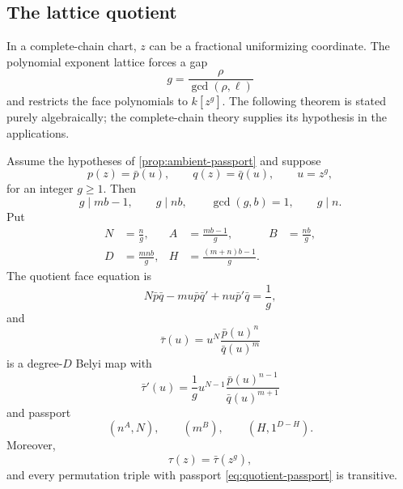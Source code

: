 \documentclass[11pt,reqno]{amsart}
\begin{document}
\subsection{The lattice quotient}

In a complete-chain chart, \(z\) can be a fractional uniformizing
coordinate.  The polynomial exponent lattice forces a gap
\[
g=\frac{\rho}{\gcd(\rho,\ell)}
\]
and restricts the face polynomials to \(k[z^g]\).  The following theorem is
stated purely algebraically; the complete-chain theory supplies its
hypothesis in the applications.

\begin{theorem}
\label{thm:lattice-gap}
Assume the hypotheses of \cref{prop:ambient-passport} and suppose
\[
p(z)=\bar p(u),\qquad q(z)=\bar q(u),\qquad u=z^g,
\]
for an integer \(g\ge1\).  Then
\[
g\mid mb-1,\qquad g\mid nb,\qquad \gcd(g,b)=1,\qquad g\mid n.
\]
Put
\begin{align*}
N&=\frac ng,&
A&=\frac{mb-1}{g},&
B&=\frac{nb}{g},\\
D&=\frac{mnb}{g},&
H&=\frac{(m+n)b-1}{g}.&&
\end{align*}
The quotient face equation is
\begin{equation}
\label{eq:quotient-ode}
N\bar p\bar q-mu\bar p\bar q'
+nu\bar p'\bar q=\frac1g,
\end{equation}
and
\begin{equation}
\label{eq:quotient-map}
\bar\tau(u)=u^N\frac{\bar p(u)^n}{\bar q(u)^m}
\end{equation}
is a degree-\(D\) Belyi map with
\begin{equation}
\label{eq:quotient-derivative}
\bar\tau'(u)=\frac1g
u^{N-1}\frac{\bar p(u)^{n-1}}{\bar q(u)^{m+1}}
\end{equation}
and passport
\begin{equation}
\label{eq:quotient-passport}
\left(n^A,N\right),\qquad
\left(m^B\right),\qquad
\left(H,1^{D-H}\right).
\end{equation}
Moreover,
\[
\tau(z)=\bar\tau(z^g),
\]
and every permutation triple with passport
\eqref{eq:quotient-passport} is transitive.
\end{theorem}
\end{document}
